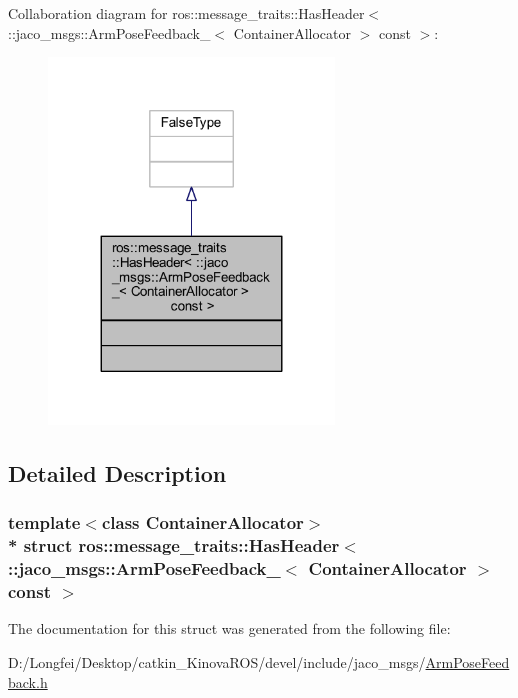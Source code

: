 Collaboration diagram for ros\+:\+:message\+\_\+traits\+:\+:Has\+Header$<$ \+:\+:jaco\+\_\+msgs\+:\+:Arm\+Pose\+Feedback\+\_\+$<$ Container\+Allocator $>$ const $>$\+:
\nopagebreak
\begin{figure}[H]
\begin{center}
\leavevmode
\includegraphics[width=215pt]{df/d9f/structros_1_1message__traits_1_1HasHeader_3_01_1_1jaco__msgs_1_1ArmPoseFeedback___3_01ContainerA35c6a74387fea1a8ca77a4ae0da81313}
\end{center}
\end{figure}


\subsection{Detailed Description}
\subsubsection*{template$<$class Container\+Allocator$>$\\*
struct ros\+::message\+\_\+traits\+::\+Has\+Header$<$ \+::jaco\+\_\+msgs\+::\+Arm\+Pose\+Feedback\+\_\+$<$ Container\+Allocator $>$ const  $>$}



The documentation for this struct was generated from the following file\+:\begin{DoxyCompactItemize}
\item 
D\+:/\+Longfei/\+Desktop/catkin\+\_\+\+Kinova\+R\+O\+S/devel/include/jaco\+\_\+msgs/\hyperlink{ArmPoseFeedback_8h}{Arm\+Pose\+Feedback.\+h}\end{DoxyCompactItemize}
